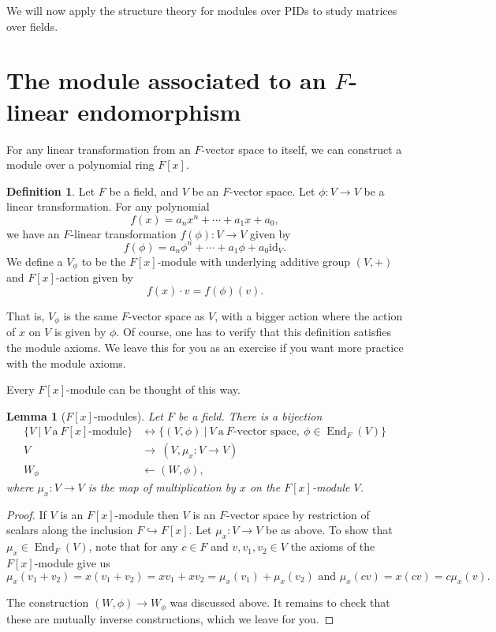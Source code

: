\documentclass[12pt]{report}
\newtheorem{lemma}[theorem]{Lemma}
\numberwithin{equation}{section}
\numberwithin{theorem}{chapter}
\theoremstyle{definition}
\newtheorem{definition}[theorem]{Definition}
\newtheorem*{basic properties}{Basic Properties}
\newtheorem*{Important Remark}{Important Remark}
\DeclareMathOperator{\End}{End}
\begin{document}
We will now apply the structure theory for modules over PIDs to study matrices over fields. 


\section{The module associated to an $F$-linear endomorphism}
 
For any linear transformation from an $F$-vector space to itself, we can construct a module over a polynomial ring $F[x]$.

\begin{definition}
Let $F$ be a field, and $V$ be an $F$-vector space. Let $\phi:V\to V$ be a linear transformation. For any polynomial 
\[ f(x) = a_n x^n + \cdots + a_1 x + a_0,\]
we have an $F$-linear transformation $f(\phi): V\to V$ given by
\[ f(\phi) = a_n \phi^n + \cdots  + a_1 \phi + a_0 \mathrm{id}_V.\]
We define a $V_\phi$ to be the $F[x]$-module with underlying additive group $(V,+)$ and $F[x]$-action given by
\[ f(x) \cdot v = f(\phi)(v).\]
\end{definition}

That is, $V_\phi$ is the same $F$-vector space as $V$, with a bigger action where the action of $x$ on $V$ is given by $\phi$. Of course, one has to verify that this definition satisfies the module axioms. We leave this for you as an exercise if you want more practice with the module axioms.

Every $F[x]$-module can be thought of this way.


\begin{lemma}[{$F[x]$-modules}]\label{F[x]mod}
Let $F$ be a field. There is a bijection
\[\begin{aligned} \{V \ | \  V \ \text{a} \ F[x]\text{-module}\} &\longleftrightarrow \{(V,\phi) \ | \  V \ \text{a} \ F\text{-vector space}, \ \phi\in \End_F(V)\}\\
V &\rightarrow \ (V, \mu_x:V\to V)\\
W_{\phi} &\leftarrow (W,\phi),
\end{aligned}\]
where $\mu_x:V\to V$ is the map of multiplication by $x$ on the $F[x]$-module $V$.
\end{lemma}

\begin{proof}
If $V$ is an $F[x]$-module then $V$ is an $F$-vector space by restriction of scalars along the inclusion $F \hookrightarrow F[x]$. Let $\mu_x:V\to V$ be as above. To show that $\mu_x\in \End_F(V)$, note that for any $c\in F$ and $v,v_1, v_2\in V$ the axioms of the $F[x]$-module give us
$$\mu_x(v_1+v_2)=x(v_1+v_2)=xv_1+xv_2=\mu_x(v_1)+\mu_x(v_2) \textrm{  
and } \mu_x(cv)=x(cv)=c \mu_x(v).$$

The construction $(W,\phi) \to W_\phi$ was discussed above. It remains to check that these are mutually inverse constructions, which we leave for you.
\end{proof}
\end{document}

